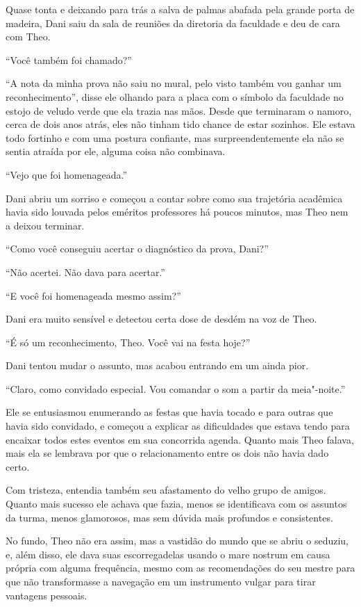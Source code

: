 Quase tonta e deixando para trás a salva de palmas abafada pela grande
porta de madeira, Dani saiu da sala de reuniões da diretoria da
faculdade e deu de cara com Theo.

``Você também foi chamado?''

``A nota da minha prova não saiu no mural, pelo visto também vou ganhar
um reconhecimento'', disse ele olhando para a placa com o símbolo da
faculdade no estojo de veludo verde que ela trazia nas mãos. Desde que
terminaram o namoro, cerca de dois anos atrás, eles não tinham tido
chance de estar sozinhos. Ele estava todo fortinho e com uma postura
confiante, mas surpreendentemente ela não se sentia atraída por ele,
alguma coisa não combinava.

``Vejo que foi homenageada.''

Dani abriu um sorriso e começou a contar sobre como sua trajetória
acadêmica havia sido louvada pelos eméritos professores há poucos
minutos, mas Theo nem a deixou terminar.

``Como você conseguiu acertar o diagnóstico da prova, Dani?''

``Não acertei. Não dava para acertar.''

``E você foi homenageada mesmo assim?''

Dani era muito sensível e detectou certa dose de desdém na voz de Theo.

``É só um reconhecimento, Theo. Você vai na festa hoje?''

Dani tentou mudar o assunto, mas acabou entrando em um ainda pior.

``Claro, como convidado especial. Vou comandar o som a partir da
meia"-noite.''

Ele se entusiasmou enumerando as festas que havia tocado e para outras
que havia sido convidado, e começou a explicar as dificuldades que
estava tendo para encaixar todos estes eventos em sua concorrida agenda.
Quanto mais Theo falava, mais ela se lembrava por que o relacionamento
entre os dois não havia dado certo.

Com tristeza, entendia também seu afastamento do velho grupo de amigos.
Quanto mais sucesso ele achava que fazia, menos se identificava com
os assuntos da turma, menos glamorosos, mas sem dúvida mais profundos e
consistentes.

No fundo, Theo não era assim, mas a vastidão do mundo que se abriu o
seduziu, e, além disso, ele dava suas escorregadelas usando o mare
nostrum em causa própria com alguma frequência, mesmo com as recomendações
do seu mestre para que não transformasse a navegação em um instrumento
vulgar para tirar vantagens pessoais.

